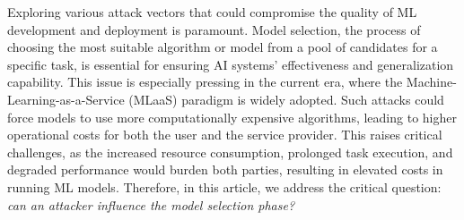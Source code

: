 Exploring various attack vectors that could compromise the quality of ML development and deployment is paramount.
Model selection, the process of choosing the most suitable algorithm or model from a pool of candidates for a specific task, is essential for ensuring AI systems' effectiveness and generalization capability.
This issue is especially pressing in the current era, where the Machine-Learning-as-a-Service (MLaaS) paradigm is widely adopted.
Such attacks could force models to use more computationally expensive algorithms, leading to higher operational costs for both the user and the service provider.
This raises critical challenges, as the increased resource consumption, prolonged task execution, and degraded performance would burden both parties, resulting in elevated costs in running ML models.
Therefore, in this article, we address the critical question: \textit{can an attacker influence the model selection phase?}
